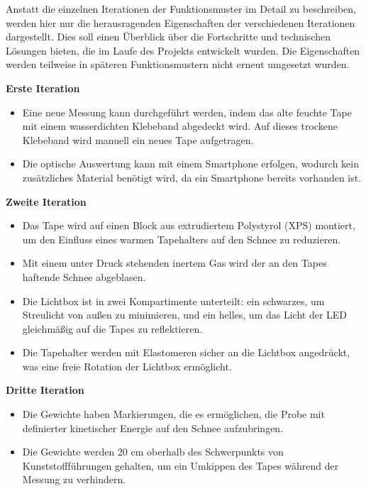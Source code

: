Anstatt die einzelnen Iterationen der Funktionsmuster im Detail zu beschreiben, werden hier nur die herausragenden Eigenschaften der verschiedenen Iterationen dargestellt.  Dies soll einen Überblick über die Fortschritte und technischen Lösungen bieten, die im Laufe des Projekts entwickelt wurden. Die Eigenschaften werden teilweise in späteren Funktionsmustern nicht erneut umgesetzt wurden.


\textbf{Erste Iteration}

\begin{itemize}
    \item Eine neue Messung kann durchgeführt werden, indem das alte feuchte Tape mit einem wasserdichten Klebeband abgedeckt wird. Auf dieses trockene Klebeband wird manuell ein neues Tape aufgetragen.
    \item Die optische Auswertung kann mit einem Smartphone erfolgen, wodurch kein zusätzliches Material benötigt wird, da ein Smartphone bereits vorhanden ist.
\end{itemize}

\textbf{Zweite Iteration}

\begin{itemize}
    
    \item Das Tape wird auf einen Block aus extrudiertem Polystyrol (XPS) montiert, um den Einfluss eines warmen Tapehalters auf den Schnee zu reduzieren.
    \item Mit einem unter Druck stehenden inertem Gas wird der an den Tapes haftende Schnee abgeblasen.
    \item Die Lichtbox ist in zwei Kompartimente unterteilt: ein schwarzes, um Streulicht von außen zu minimieren, und ein helles, um das Licht der LED gleichmäßig auf die Tapes zu reflektieren.
    \item Die Tapehalter werden mit Elastomeren sicher an die Lichtbox angedrückt, was eine freie Rotation der Lichtbox ermöglicht.

\end{itemize}

\textbf{Dritte Iteration}

\begin{itemize}
    \item Die Gewichte haben Markierungen, die es ermöglichen, die Probe mit definierter kinetischer Energie auf den Schnee aufzubringen.
    \item Die Gewichte werden 20 cm oberhalb des Schwerpunkts von Kunststoffführungen gehalten, um ein Umkippen des Tapes während der Messung zu verhindern.
\end{itemize}

